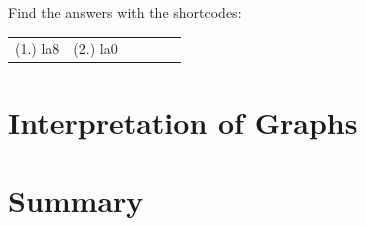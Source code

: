     \label{m39414*eip-300}
\par {} Find the answers with the shortcodes:
 \par \begin{tabular}[h]{cccccc}
 (1.) la8  &  (2.) la0  & \end{tabular}
\section{Interpretation of Graphs}
            \section{ Summary}
            \nopagebreak
